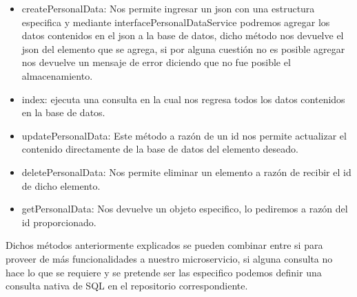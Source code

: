	\begin{itemize}
		\item createPersonalData: Nos permite ingresar un json con una estructura especifica y mediante interfacePersonalDataService podremos agregar los datos contenidos en el json a la base de datos, dicho método nos devuelve el json del elemento que se agrega, si por alguna cuestión no es posible agregar nos devuelve un mensaje de error diciendo que no fue posible el almacenamiento.
		\item index: ejecuta una consulta en la cual nos regresa todos los datos contenidos en la base de datos. 
		\item updatePersonalData: Este método a razón de un id nos permite actualizar el contenido directamente de la base de datos del elemento deseado.
		\item deletePersonalData: Nos permite eliminar un elemento a razón de recibir el id de dicho elemento.
		\item getPersonalData: Nos devuelve un objeto especifico, lo pediremos a razón del id proporcionado.
	\end{itemize}

	Dichos métodos anteriormente explicados se pueden combinar entre si para proveer de más funcionalidades a nuestro microservicio, si alguna consulta no hace lo que se requiere y se pretende ser las especifico podemos definir una consulta nativa de SQL en el repositorio correspondiente.
